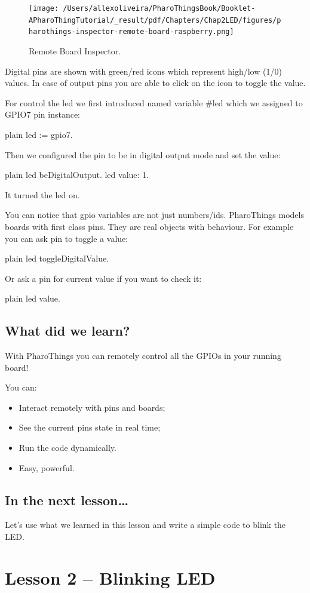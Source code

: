 \documentclass[10pt,twoside,english]{_support/latex/sbabook/sbabook}
\begin{document}
\begin{figure}

\begin{center}
\texttt{[image: /Users/allexoliveira/PharoThingsBook/Booklet-APharoThingTutorial/\_result/pdf/Chapters/Chap2LED/figures/pharothings-inspector-remote-board-raspberry.png]}\caption{Remote Board Inspector.\label{remoteBoard}}\end{center}
\end{figure}


Digital pins are shown with green/red icons which represent high/low (1/0) values. In case of output pins you are able to click on the icon to toggle the value.

For control the led we first introduced named variable \#led which we assigned to GPIO7 pin instance:

\begin{displaycode}{plain}
led := gpio7.
\end{displaycode}

Then we configured the pin to be in digital output mode and set the value:

\begin{displaycode}{plain}
led beDigitalOutput.
led value: 1.
\end{displaycode}

It turned the led on.

You can notice that gpio variables are not just numbers/ids. PharoThings models boards with first class pins. They are real objects with behaviour. For example you can ask pin to toggle a value:

\begin{displaycode}{plain}
led toggleDigitalValue.
\end{displaycode}

Or ask a pin for current value if you want to check it:

\begin{displaycode}{plain}
led value.
\end{displaycode}
\section{What did we learn?}
With PharoThings you can remotely control all the GPIOs in your running board!

You can:

\begin{itemize}
\item Interact remotely with pins and boards;
\item See the current pins state in real time;
\item Run the code dynamically.
\item Easy, powerful.
\end{itemize}
\section{In the next lesson…}
Let’s use what we learned in this lesson and write a simple code to blink the LED.
\chapter{Lesson 2 – Blinking LED }

\backmatter

\end{document}
